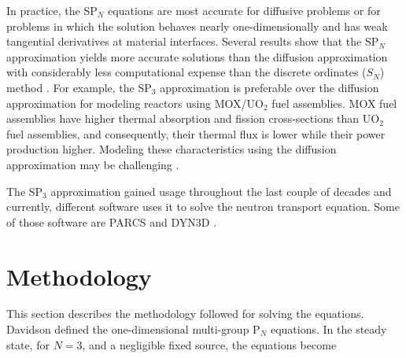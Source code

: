 \documentclass{anstrans}
\begin{document}
In practice, the SP$_N$ equations are most accurate for diffusive problems or for problems in which the solution behaves nearly one-dimensionally and has weak tangential derivatives at material interfaces.
Several results show that the SP$_N$ approximation yields more accurate solutions than the diffusion approximation \cite{mui_modified_1987} \cite{beckert_development_2007} \cite{fliscounakis_potential_2012} \cite{ryu_finite_2013} with considerably less computational expense than the discrete ordinates ($S_N$) method \cite{brantley_simplifiedP3_2000}.
For example, the SP$_3$ approximation is preferable over the diffusion approximation for modeling reactors using MOX/UO$_2$ fuel assemblies.
MOX fuel assemblies have higher thermal absorption and fission cross-sections than UO$_2$ fuel assemblies, and consequently, their thermal flux is lower while their power production higher.
Modeling these characteristics using the diffusion approximation may be challenging \cite{brantley_simplifiedP3_2000} \cite{capilla_applications_2009}.

The SP$_3$ approximation gained usage throughout the last couple of decades and currently, different software uses it to solve the neutron transport equation.
Some of those software are PARCS \cite{downar_parcs_2004} and DYN3D \cite{beckert_development_2007}.

\section{Methodology}

This section describes the methodology followed for solving the equations.
Davidson \cite{davidson_neutron_1957} defined the one-dimensional multi-group P$_N$ equations.
In the steady state, for $N=3$, and a negligible fixed source, the equations become
\end{document}
